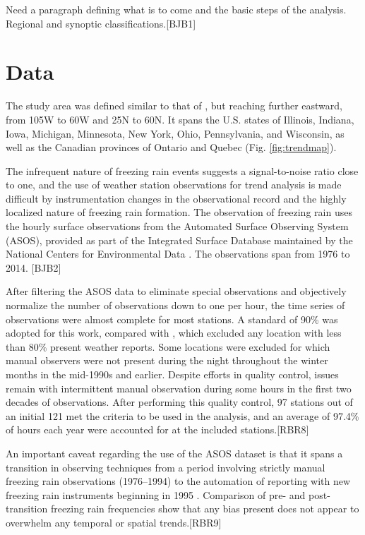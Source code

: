 \documentclass[twocol]{ametsoc}
\begin{document}
Need a paragraph defining what is to come and the basic steps of the analysis.  Regional and synoptic classifications.[BJB1]



\section{Data}

The study area was defined similar to that of \citet{cortinas2000climatology}, but reaching further eastward, from 105\degree W to 60\degree W and 25\degree N to 60\degree N. It spans the U.S. states of Illinois, Indiana, Iowa, Michigan, Minnesota, New York, Ohio, Pennsylvania, and Wisconsin, as well as the Canadian provinces of Ontario and Quebec (Fig. \ref{fig:trendmap}).



The infrequent nature of freezing rain events suggests a signal-to-noise ratio close to one, and the use of weather station observations for trend analysis is made difficult by instrumentation changes in the observational record and the highly localized nature of freezing rain formation.  The observation of freezing rain uses the hourly surface observations from the Automated Surface Observing System (ASOS), provided as part of the Integrated Surface Database maintained by the National Centers for Environmental Data \citep{smith2011integrated}. The observations span from 1976 to 2014. [BJB2]



After filtering the ASOS data to eliminate special observations and objectively normalize the number of observations down to one per hour, the time series of observations were almost complete for most stations.  A standard of 90\% was adopted for this work, compared with \citet{cortinas2000climatology}, which excluded any location with less than 80\% present weather reports. Some locations were excluded for which manual observers were not present during the night throughout the winter months in the mid-1990s and earlier. Despite efforts in quality control, issues remain with intermittent manual observation during some hours in the first two decades of observations. After performing this quality control, 97 stations out of an initial 121 met the criteria to be used in the analysis, and an average of 97.4\% of hours each year were accounted for at the included stations.[RBR8]



An important caveat regarding the use of the ASOS dataset is that it spans a transition in observing techniques from a period involving strictly manual freezing rain observations (1976--1994) to the automation of reporting with new freezing rain instruments beginning in 1995 \citep{ramsay1995status,asos1998}. Comparison of pre- and post-transition freezing rain frequencies show that any bias present does not appear to overwhelm any temporal or spatial trends.[RBR9]
\end{document}
